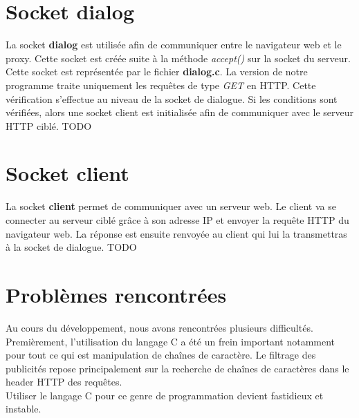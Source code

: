 \documentclass[a4paper,11pt, oneside]{book}
\def\todo{{\color{red}\Huge{TODO}}}
\begin{document}
		\section{Socket dialog}

			La socket \textbf{dialog} est utilisée afin de communiquer entre le navigateur web et le proxy. Cette socket est créée
			suite à la méthode \textit{accept()} sur la socket du serveur. Cette socket est représentée par le fichier \textbf{dialog.c}.
			La version de notre programme traite uniquement les requêtes de type \textit{GET} en HTTP. Cette vérification s'effectue au niveau de la socket
			de dialogue. Si les conditions sont vérifiées, alors une socket client est initialisée afin de communiquer avec le serveur HTTP ciblé.
			\todo

		\section{Socket client}

			La socket \textbf{client} permet de communiquer avec un serveur web. Le client va se connecter au serveur ciblé grâce à son adresse IP
			et envoyer la requête HTTP du navigateur web. La réponse est ensuite renvoyée
			au client qui lui la transmettras à la socket de dialogue.
			\todo

		\section{Problèmes rencontrées}

			Au cours du développement, nous avons rencontrées plusieurs difficultés.
			Premièrement, l'utilisation du langage C a été un frein important notamment pour tout ce qui est
			manipulation de chaînes de caractère.
			Le filtrage des publicités repose principalement sur la recherche de chaînes de caractères dans le header HTTP des requêtes.\\
			Utiliser le langage C pour ce genre de programmation devient fastidieux et instable.
\end{document}
